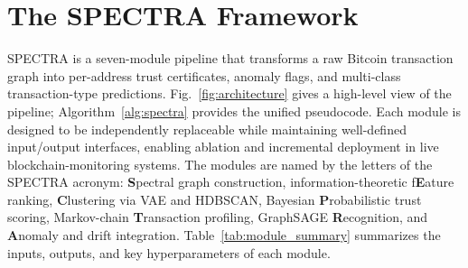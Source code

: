 %

\section{The SPECTRA Framework}
\label{sec:framework}

\textsc{SPECTRA} is a seven-module pipeline that transforms a raw Bitcoin
transaction graph into per-address trust certificates, anomaly flags, and
multi-class transaction-type predictions.
Fig.~\ref{fig:architecture} gives a high-level view of the pipeline;
Algorithm~\ref{alg:spectra} provides the unified pseudocode.
Each module is designed to be independently replaceable while maintaining
well-defined input/output interfaces, enabling ablation and incremental
deployment in live blockchain-monitoring systems.
The modules are named by the letters of the \textsc{SPECTRA} acronym:
\textbf{S}pectral graph construction,
information-theoretic f\textbf{E}ature ranking,
\textbf{C}lustering via VAE and HDBSCAN,
Bayesian \textbf{P}robabilistic trust scoring,
Markov-chain \textbf{T}ransaction profiling,
GraphSAGE \textbf{R}ecognition, and
\textbf{A}nomaly and drift integration.
Table~\ref{tab:module_summary} summarizes the inputs, outputs, and key
hyperparameters of each module.


